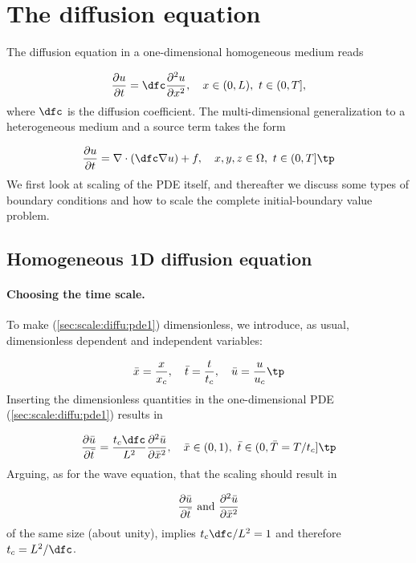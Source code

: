\documentclass[graybox,envcountchap,sectrefs,final]{svmonodo}
\begin{document}
\section{The diffusion equation}
\label{sec:scale:diffu}

The diffusion equation in a one-dimensional homogeneous medium reads

\begin{equation}
\frac{\partial u}{\partial t} =
\dfc\frac{\partial^2 u}{\partial x^2}, \quad  x\in (0,L),\ t\in (0,T],
\label{sec:scale:diffu:pde1}
\end{equation}
where $\dfc$ is the diffusion coefficient. The
multi-dimensional generalization to a heterogeneous medium
and a source term takes the form

\begin{equation}
\frac{\partial u}{\partial t} =
\nabla\cdot\left(\dfc \nabla u\right) + f, \quad  x,y,z\in \Omega,\ t\in (0,T]\tp
\label{sec:scale:diffu:pde1:3D}
\end{equation}
We first look at scaling of the PDE itself, and thereafter we discuss
some types of boundary conditions and how to scale the complete
initial-boundary value problem.


\subsection{Homogeneous 1D diffusion equation}
\label{sec:scale:diffu:homo1D}

\paragraph{Choosing the time scale.}
To make (\ref{sec:scale:diffu:pde1}) dimensionless,
we introduce, as usual, dimensionless dependent and independent variables:

\[ \bar x = \frac{x}{x_c},
\quad \bar t = \frac{t}{t_c}, \quad \bar u =\frac{u}{u_c}\tp\]
Inserting the dimensionless quantities in the one-dimensional
PDE (\ref{sec:scale:diffu:pde1}) results in

\[
\frac{\partial \bar u}{\partial \bar t} =
\frac{t_c\dfc}{L^2}
\frac{\partial^2 \bar u}{\partial \bar x^2}, \quad  \bar x\in (0,1),\ \bar t\in (0,\bar T = T/t_c]\tp
\label{sec:scale:diffu:pde1:d0}
\]
Arguing, as for the wave equation, that the scaling should result in

\[ \frac{\partial \bar u}{\partial \bar t}\hbox{ and }
\frac{\partial^2 \bar u}{\partial \bar x^2}\]
of the same size (about unity),
implies $t_c\dfc/L^2=1$ and therefore $t_c = L^2/\dfc$.
\end{document}
